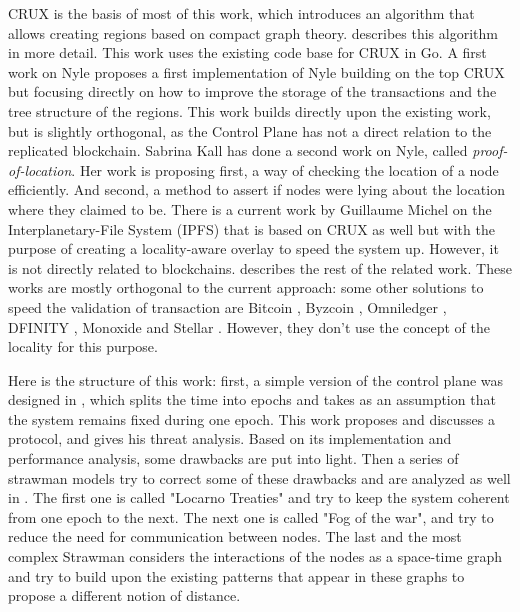 \documentclass[a4paper,11pt,twoside=semi,openright]{report}
\begin{document}
CRUX \cite{Basescu2014} is the basis of most of this work, which introduces an
algorithm that allows creating regions based on compact graph theory.
 describes this algorithm in more detail. This work uses
the existing code base for CRUX in Go. A first work on Nyle \cite{Sierro2019}
proposes a first implementation of Nyle building on the top CRUX
\cite{Basescu2014} but focusing directly on how to improve the storage of the
transactions and the tree structure of the regions. This work builds directly
upon the existing work, but is slightly orthogonal, as the Control Plane has
not a direct relation to the replicated blockchain. Sabrina Kall
\cite{Kall2019} has done a second work on Nyle, called
\textit{proof-of-location}. Her work is proposing first, a way of checking the
location of a node efficiently. And second, a method to assert if nodes were
lying about the location where they claimed to be. There is a current work by
Guillaume Michel on the Interplanetary-File System (IPFS) \cite{Michel2019}
that is based on CRUX as well but with the purpose of creating a locality-aware
overlay to speed the system up. However, it is not directly related to
blockchains.  describes the rest of the related work.
These works are mostly orthogonal to the current approach: some other solutions
to speed the validation of transaction are Bitcoin \cite{Nakamoto2009}, Byzcoin
\cite{Kogias2016}, Omniledger \cite{Kokoris-Kogias2017}, DFINITY
\cite{Hanke2018}, Monoxide \cite{Wang2019} and Stellar \cite{Lokhava2019}.
However, they don't use the concept of the locality for this purpose. 

Here is the structure of this work: first, a simple version of the control
plane was designed in , which splits the time into epochs and
takes as an assumption that the system remains fixed during one epoch. This
work proposes and discusses a protocol, and gives his threat analysis.  Based
on its implementation and performance analysis, some drawbacks are put into
light. Then a series of strawman models try to correct some of these drawbacks
and are analyzed as well in . The first one is called
"Locarno Treaties" and try to keep the system coherent from one epoch to the
next. The next one is called "Fog of the war", and try to reduce the need for
communication between nodes. The last and the most complex Strawman considers
the interactions of the nodes as a space-time graph and try to build upon the
existing patterns that appear in these graphs to propose a different notion of
distance. 
\end{document}
